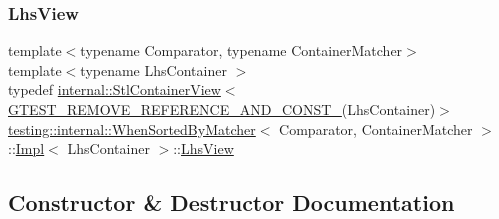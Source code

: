 \mbox{\label{classtesting_1_1internal_1_1_when_sorted_by_matcher_1_1_impl_a4c84fddfe1bf967a73e5dae1940db427}} 
\subsubsection{\texorpdfstring{Lhs\+View}{LhsView}}
{\footnotesize\ttfamily template$<$typename Comparator, typename Container\+Matcher$>$ \\
template$<$typename Lhs\+Container $>$ \\
typedef \hyperlink{classtesting_1_1internal_1_1_stl_container_view}{internal\+::\+Stl\+Container\+View}$<$ \hyperlink{gtest-internal_8h_a874567b176266188fabfffb8393267ce}{G\+T\+E\+S\+T\+\_\+\+R\+E\+M\+O\+V\+E\+\_\+\+R\+E\+F\+E\+R\+E\+N\+C\+E\+\_\+\+A\+N\+D\+\_\+\+C\+O\+N\+S\+T\+\_\+}(Lhs\+Container)$>$ \hyperlink{classtesting_1_1internal_1_1_when_sorted_by_matcher}{testing\+::internal\+::\+When\+Sorted\+By\+Matcher}$<$ Comparator, Container\+Matcher $>$\+::\hyperlink{classtesting_1_1internal_1_1_when_sorted_by_matcher_1_1_impl}{Impl}$<$ Lhs\+Container $>$\+::\hyperlink{classtesting_1_1internal_1_1_when_sorted_by_matcher_1_1_impl_a4c84fddfe1bf967a73e5dae1940db427}{Lhs\+View}}



\subsection{Constructor \& Destructor Documentation}
\mbox{\label{classtesting_1_1internal_1_1_when_sorted_by_matcher_1_1_impl_a63235e98dec5478b7ff9d06f6babc716}} 
